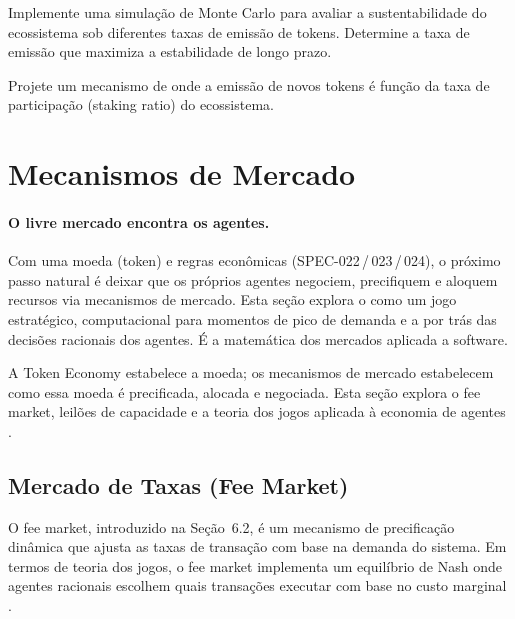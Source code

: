 \begin{exercicio}
Implemente uma simulação de Monte Carlo para avaliar a
sustentabilidade do ecossistema sob diferentes taxas de emissão
de tokens. Determine a taxa de emissão que maximiza a
estabilidade de longo prazo.
\end{exercicio}

\begin{exercicio}
Projete um mecanismo de  onde
a emissão de novos tokens é função da taxa de participação
(staking ratio) do ecossistema.
\end{exercicio}

\section{Mecanismos de Mercado}
\label{sec:mecanismos-mercado}
\nivelavancado

\paragraph{O livre mercado encontra os agentes.} Com uma moeda (token) e regras econômicas (SPEC-022\,/\,023\,/\,024), o próximo passo natural é deixar que os próprios agentes negociem, precifiquem e aloquem recursos via mecanismos de mercado. Esta seção explora o  como um jogo estratégico,  computacional para momentos de pico de demanda e a  por trás das decisões racionais dos agentes. É a matemática dos mercados aplicada a software.

A Token Economy estabelece a moeda; os mecanismos de mercado
estabelecem como essa moeda é precificada, alocada e negociada.
Esta seção explora o fee market, leilões de capacidade e a teoria
dos jogos aplicada à economia de agentes \cite{opencode2026token,
nash1950equilibrium, vonneumann1944theory}.

\subsection{Mercado de Taxas (Fee Market)}

O fee market, introduzido na Seção~6.2, é um mecanismo de
precificação dinâmica que ajusta as taxas de transação com base
na demanda do sistema. Em termos de teoria dos jogos, o fee market
implementa um equilíbrio de Nash onde agentes racionais escolhem
quais transações executar com base no custo marginal
\cite{nash1950equilibrium, shoham2023multiagent}.

